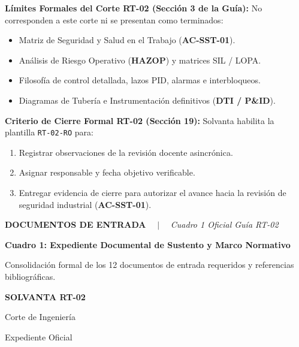 \documentclass[10pt,landscape]{article}
\newcommand{\slideheader}[4]{%
  \noindent
  \begin{minipage}[c]{0.78\textwidth}
    {\fontsize{7pt}{8.5pt}\selectfont \textbf{\color{accentcyan}#1} \ \ $|$ \ \ \textit{\color{black!70}#2}}\par
    \vspace{1.5pt}
    {\fontsize{12pt}{14pt}\selectfont \textbf{\color{navyblue}#3}}\par
    \vspace{1.5pt}
    {\fontsize{7.2pt}{8.8pt}\selectfont \color{black!80}#4}
  \end{minipage}
  \hfill
  \begin{minipage}[c]{0.20\textwidth}
    \begin{tcolorbox}[colback=navyblue,colframe=navyblue,arc=1.5mm,boxrule=0pt,top=2.5pt,bottom=2.5pt,left=4pt,right=4pt]
      \centering
      {\color{white}\fontsize{7.5pt}{9pt}\selectfont \textbf{SOLVANTA RT-02}}\par
      \vspace{1pt}
      {\color{accentcyan}\fontsize{6pt}{7.5pt}\selectfont Corte de Ingeniería}\par
      {\color{white!80}\fontsize{5.5pt}{7pt}\selectfont Expediente Oficial}
    \end{tcolorbox}
  \end{minipage}
  \par\vspace{2pt}
  \noindent{\color{navyblue}\rule{\textwidth}{1.0pt}}
  \par\vspace{2pt}
}
\begin{document}
\begin{minipage}[t]{0.54\textwidth}
  \begin{tcolorbox}[colback=white,colframe=darkred!60,arc=1.5mm,boxrule=0.7pt,top=2.5pt,bottom=2.5pt,left=6pt,right=6pt]
    \textbf{\fontsize{7.5pt}{9pt}\selectfont \color{darkred}Límites Formales del Corte RT-02 (Sección 3 de la Guía):}
    \vspace{1pt}
    \scriptsize
    No corresponden a este corte ni se presentan como terminados:
    \begin{itemize}\setlength{\itemsep}{0.5pt}
      \item Matriz de Seguridad y Salud en el Trabajo (\textbf{AC-SST-01}).
      \item Análisis de Riesgo Operativo (\textbf{HAZOP}) y matrices SIL / LOPA.
      \item Filosofía de control detallada, lazos PID, alarmas e interbloqueos.
      \item Diagramas de Tubería e Instrumentación definitivos (\textbf{DTI / P\&ID}).
    \end{itemize}
  \end{tcolorbox}
\end{minipage}
\hfill
\begin{minipage}[t]{0.44\textwidth}
  \begin{tcolorbox}[colback=white,colframe=navyblue!60,arc=1.5mm,boxrule=0.7pt,top=2.5pt,bottom=2.5pt,left=6pt,right=6pt]
    \textbf{\fontsize{7.5pt}{9pt}\selectfont \color{navyblue}Criterio de Cierre Formal RT-02 (Sección 19):}
    \vspace{1pt}
    \scriptsize
    Solvanta habilita la plantilla \texttt{RT-02-RO} para:
    \begin{enumerate}\setlength{\itemsep}{0.5pt}
      \item Registrar observaciones de la revisión docente asincrónica.
      \item Asignar responsable y fecha objetivo verificable.
      \item Entregar evidencia de cierre para autorizar el avance hacia la revisión de seguridad industrial (\textbf{AC-SST-01}).
    \end{enumerate}
  \end{tcolorbox}
\end{minipage}

\newpage

\slideheader{DOCUMENTOS DE ENTRADA}{Cuadro 1 Oficial Guía RT-02}{Cuadro 1: Expediente Documental de Sustento y Marco Normativo}{Consolidación formal de los 12 documentos de entrada requeridos y referencias bibliográficas.}
\end{document}

